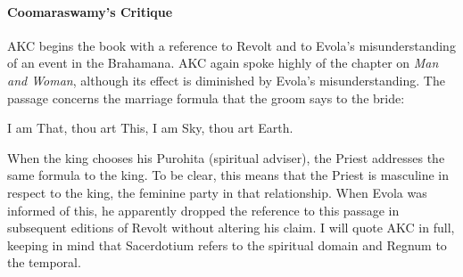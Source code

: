 \paragraph{Coomaraswamy's Critique}


AKC begins the book with a reference to Revolt and to Evola's misunderstanding of an event in the Brahamana. AKC again spoke highly of the chapter on \emph{Man and Woman}, although its effect is diminished by Evola's misunderstanding. The passage concerns the marriage formula that the groom says to the bride:

\begin{quotex}
I am That, thou art This, I am Sky, thou art Earth.
\end{quotex}


When the king chooses his Purohita (spiritual adviser), the Priest addresses the same formula to the king. To be clear, this means that the Priest is masculine in respect to the king, the feminine party in that relationship. When Evola was informed of this, he apparently dropped the reference to this passage in subsequent editions of Revolt without altering his claim. I will quote AKC in full, keeping in mind that Sacerdotium refers to the spiritual domain and Regnum to the temporal.

